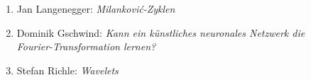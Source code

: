 \documentclass[handout]{beamer}
\begin{document}
\begin{frame}
\begin{columns}[t,onlytextwidth]
\begin{column}{0.65\textwidth}
\begin{description}
\begin{enumerate}
\item Jan Langenegger: {\em Milankovi\'c-Zyklen}
\item Dominik Gschwind: {\em Kann ein künstliches neuronales Netzwerk
die Fourier-Transformation lernen?}
\item Stefan Richle: {\em Wavelets}
\end{enumerate}
\end{description}
\end{column}
\begin{column}{0.01\textwidth}
\end{column}
\end{columns}
\end{frame}
\end{document}
